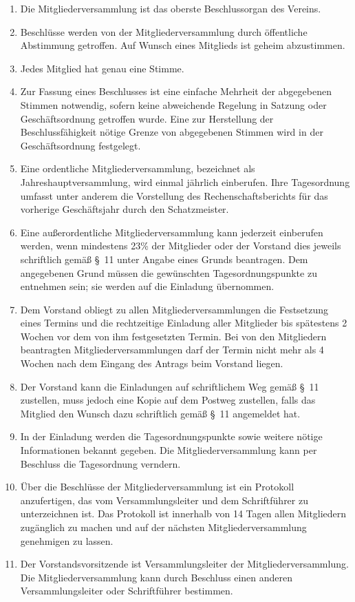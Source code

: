 \documentclass[10pt,a4paper]{scrartcl}
\begin{document}
\begin{enumerate}

        \item Die Mitgliederversammlung ist das oberste Beschlussorgan des Vereins.
	\item Beschl{\"u}sse werden von der Mitgliederversammlung durch {\"o}ffentliche Abstimmung getroffen.
		Auf Wunsch eines Mitglieds ist geheim abzustimmen.
	\item Jedes Mitglied hat genau eine Stimme.
	\item Zur Fassung eines Beschlusses ist eine einfache Mehrheit der abgegebenen Stimmen
             notwendig, sofern keine abweichende Regelung in Satzung oder Gesch{\"a}ftsordnung getroffen wurde.
			 Eine zur Herstellung der Beschlussf{\"a}higkeit n{\"o}tige Grenze von abgegebenen Stimmen wird in der
			 Gesch{\"a}ftsordnung festgelegt.
	\item Eine ordentliche Mitgliederversammlung, bezeichnet als Jahreshauptversammlung,
		wird einmal j{\"a}hrlich einberufen. Ihre Tagesordnung umfasst unter anderem die
		Vorstellung des Rechenschaftsberichts f{\"u}r das vorherige Gesch{\"a}ftsjahr durch
		den Schatzmeister.
	\item Eine au{\ss}erordentliche Mitgliederversammlung kann jederzeit einberufen werden, wenn
		mindestens 23\% der Mitglieder oder der Vorstand dies jeweils schriftlich gem{\"a}{\ss} \S \ 11
		unter Angabe eines Grunds beantragen. Dem angegebenen Grund m{\"u}ssen die gew{\"u}nschten
		Tagesordnungspunkte zu entnehmen sein; sie werden auf die Einladung {\"u}bernommen.
	\item Dem Vorstand obliegt zu allen Mitgliederversammlungen die Festsetzung eines Termins
		und die rechtzeitige Einladung aller Mitglieder bis sp{\"a}testens 2 Wochen vor dem
		von ihm festgesetzten Termin. Bei von den Mitgliedern beantragten
                Mitgliederversammlungen darf der Termin nicht mehr als 4 Wochen nach dem Eingang
		des Antrags beim Vorstand liegen.
	\item Der Vorstand kann die Einladungen auf schriftlichem Weg gem{\"a}{\ss} \S \ 11 zustellen, muss
		jedoch eine Kopie auf dem Postweg zustellen, falls das Mitglied den Wunsch dazu
		schriftlich gem{\"a}{\ss} \S \ 11 angemeldet hat.
	\item In der Einladung werden die Tagesordnungspunkte sowie weitere n{\"o}tige Informationen
		bekannt gegeben. Die Mitgliederversammlung kann per Beschluss die Tagesordnung
		verndern.
	\item {\"U}ber die Beschl{\"u}sse der Mitgliederversammlung ist ein Protokoll anzufertigen,
		das vom Versammlungsleiter und dem Schriftf{\"u}hrer zu unterzeichnen ist.
		Das Protokoll ist innerhalb von 14 Tagen allen Mitgliedern zug{\"a}nglich zu
		machen und auf der n{\"a}chsten Mitgliederversammlung genehmigen zu lassen.
	\item Der Vorstandsvorsitzende ist Versammlungsleiter der Mitgliederversammlung.
		Die Mitgliederversammlung kann durch Beschluss einen anderen Versammlungsleiter
		oder Schrift\-f{\"u}h\-rer bestimmen.
\end{enumerate}
%
%
\end{document}
